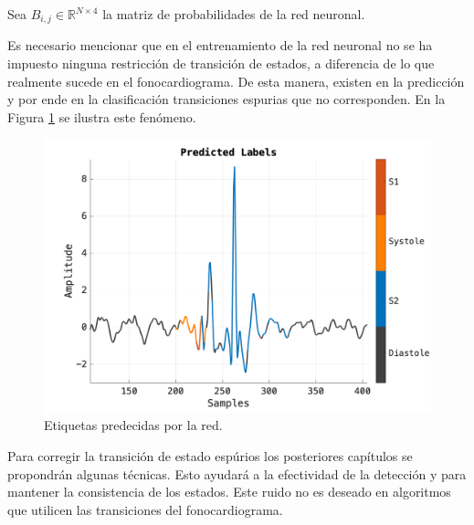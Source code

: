 \indent Sea $B_{i,j} \in \mathbb{R}^{N \times 4}$ la matriz de probabilidades de la red neuronal.


\indent Es necesario mencionar que en el entrenamiento de la red neuronal no se ha impuesto ninguna restricción de
transición de estados, a diferencia de lo que realmente sucede en el fonocardiograma. De esta manera, existen en la
predicción y por ende en la clasificación transiciones espurias que no corresponden. En la Figura
\ref{fig:spurious-transitions} se ilustra este fenómeno.

\begin{figure}[H]
  \centering
  \includegraphics[scale=0.3]{sections/chapter-07/images/predicted-labels.png}
  \caption[Etiquetas predecidas por la red]{Etiquetas predecidas por la red.}
  \label{fig:spurious-transitions}
\end{figure}

\indent Para corregir la transición de estado espúrios los posteriores capítulos se propondrán algunas técnicas.
Esto ayudará a la efectividad de la detección y para mantener la consistencia de los estados. Este ruido no es
deseado en algoritmos que utilicen las transiciones del fonocardiograma.
